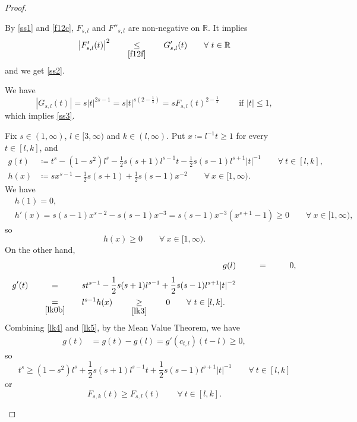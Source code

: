 \documentclass[11pt, a4paper]{article}
\numberwithin{equation}{section}
\newcommand{\coex}[2][\hphantom{longexplanation}]{%
  \underset{{#1}}{\overset{\hphantom{longexplanation}}{#2}}
}
\newcommand{\RR}{{\mathbb R}}
\newcommand{\abs}[1]{\left\lvert #1\right\rvert}
\begin{document}
\begin{proof}
\begin{itemize}[wide]
By \eqref{ss1} and \eqref{f12c}, $F_{s,l}$ and $F''_{s,l}$ are
non-negative on $\RR$. It implies
\begin{equation}
  \abs{F'_{s,l}(t)}^{2}
  \coex[\eqref{f12f}]{\le} G'_{s,l}(t)\qquad\forall~ t\in \RR
  \label{f11bb}
\end{equation}
and we get \eqref{ss2}.

We have
\[
  \abs{G_{s,l}(t)}=s|t|^{2s -1}=s|t|^{s\left(2 -\frac{1}{s} \right)}=sF_{s,l}(t)^{2 -\frac{1}{s}}
   \qquad\text{ if }|t|\le 1, \]
which implies \eqref{ss3}.
 
Fix $s\in(1,\infty)$, $l\in [3,\infty)$ and $k \in(l,\infty)$.  Put
$x\coloneqq l^{-1}t\ge 1$ for every $t\in [l,k]$, and
\begin{align}
  g(t)
  &\coloneqq t^{s}- \left(1-s^{2} \right)l^{s}-\frac{1}{2}s(s+1)l^{s-1}t - \frac{1}{2} s(s-1)l^{s+1}|t|^{-1}\qquad\forall~t\in [l,k],
    \label{lk0}\\
  h(x) &\coloneqq sx^{s-1}-\frac{1}{2}s(s+1)+\frac{1}{2}s(s-1)x^{-2}\qquad\forall~x\in[1,\infty).
\label{lk0b}
 \end{align}
 We have
 \begin{align*}
   &h(1)=0,\\
   &h'(x)=s(s-1)x^{s-2} -s(s-1)x^{-3}
=s(s-1)x^{-3}(x^{s+1}-1) \ge 0\qquad\forall~x\in[1,\infty), %
 \end{align*}
 so
 \begin{equation}
 h(x) \ge  0 \qquad\forall~x\in[1,\infty).
  \label{lk3}
\end{equation}
On the other hand,
\begin{align}
  g(l)
  &\coex{=} 0,
    \label{lk4}\\
  \begin{split}
     g'(t)
  &\coex{=} st^{s-1}-\frac{1}{2}s(s+1)l^{s-1}+\frac{1}{2}
    s(s-1)l^{s+1}|t|^{-2}\\
  &\coex[\eqref{lk0b}]{=}l^{s-1}h(x) \coex[\eqref{lk3}]{\ge} 0\qquad\forall~t\in [l,k].
  \end{split}
\label{lk5}
 \end{align}
Combining \eqref{lk4} and \eqref{lk5}, by  the Mean Value Theorem, we
have 
\begin{align*}
  g(t)
  &= g(t) - g(l)
    = g'(c_{t,l}) (t-l) \ge 0,
\end{align*}
so
\[
  t^{s}\ge \left(1-s^{2} \right)l^{s}+\frac{1}{2}s(s+1)l^{s-1}t + \frac{1}{2} s(s-1)l^{s+1}|t|^{-1}\qquad\forall~t\in [l,k]
\]
or 
\begin{equation}
  F_{s,k}(t)\ge F_{s,l}(t)\qquad\forall~t\in [l,k].
\label{sla}
\end{equation}


\end{itemize}
\end{proof}
\end{document}
